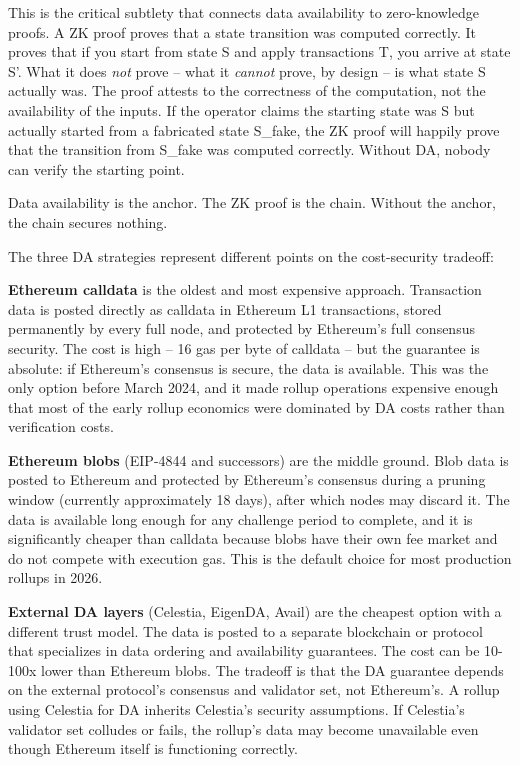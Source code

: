 \documentclass[
  11pt,
  openany]{report}
\renewcommand{\textbf}[1]{{\bfseries\color{MidnightBold}#1}}
\begin{document}
This is the critical subtlety that connects data availability to zero-knowledge
proofs. A ZK proof proves that a state transition was computed correctly. It
proves that if you start from state S and apply transactions T, you arrive at
state S'. What it does \emph{not} prove -- what it \emph{cannot} prove, by
design -- is what state S actually was. The proof attests to the correctness of
the computation, not the availability of the inputs. If the operator claims the
starting state was S but actually started from a fabricated state S\_fake, the
ZK proof will happily prove that the transition from S\_fake was computed
correctly. Without DA, nobody can verify the starting point.

Data availability is the anchor. The ZK proof is the chain. Without the anchor,
the chain secures nothing.

The three DA strategies represent different points on the cost-security
tradeoff:

\textbf{Ethereum calldata} is the oldest and most expensive approach.
Transaction data is posted directly as calldata in Ethereum L1 transactions,
stored permanently by every full node, and protected by Ethereum's full
consensus security. The cost is high -- 16 gas per byte of calldata -- but the
guarantee is absolute: if Ethereum's consensus is secure, the data is available.
This was the only option before March 2024, and it made rollup operations
expensive enough that most of the early rollup economics were dominated by DA
costs rather than verification costs.

\textbf{Ethereum blobs} (EIP-4844 and successors) are the middle ground. Blob
data is posted to Ethereum and protected by Ethereum's consensus during a
pruning window (currently approximately 18 days), after which nodes may discard
it. The data is available long enough for any challenge period to complete, and
it is significantly cheaper than calldata because blobs have their own fee
market and do not compete with execution gas. This is the default choice for
most production rollups in 2026.

\textbf{External DA layers} (Celestia, EigenDA, Avail) are the cheapest option
with a different trust model. The data is posted to a separate blockchain or
protocol that specializes in data ordering and availability guarantees. The cost
can be 10-100x lower than Ethereum blobs. The tradeoff is that the DA guarantee
depends on the external protocol's consensus and validator set, not Ethereum's.
A rollup using Celestia for DA inherits Celestia's security assumptions. If
Celestia's validator set colludes or fails, the rollup's data may become
unavailable even though Ethereum itself is functioning correctly.
\end{document}
